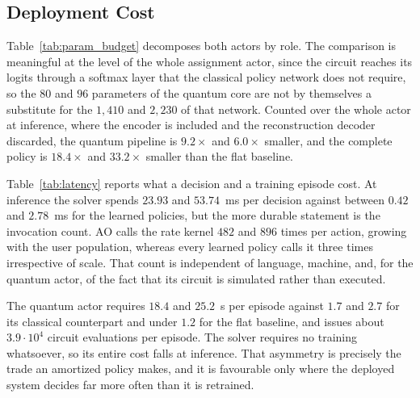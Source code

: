 \documentclass[12pt,onecolumn]{IEEEtran}
\newif\iffull
\begin{document}
\subsection{Deployment Cost}
\label{sec:results_cost}

Table~\ref{tab:param_budget} decomposes both actors by role. The comparison is meaningful at
the level of the whole assignment actor, since the circuit
reaches its logits through a softmax layer that the classical policy network does not
require, so the $80$ and $96$ parameters of the quantum core are not by themselves a
substitute for the $1{,}410$ and $2{,}230$ of that network. Counted over the whole actor at
inference, where the encoder is included and the reconstruction decoder discarded, the
quantum pipeline is $9.2\times$ and $6.0\times$ smaller, and the complete policy is
$18.4\times$ and $33.2\times$ smaller than the flat baseline.

Table~\ref{tab:latency} reports what a decision and a training episode cost. At inference
the solver spends $23.93$ and $53.74$~ms per decision against between $0.42$ and $2.78$~ms
for the learned policies, but the more durable statement is the invocation count. AO calls
the rate kernel $482$ and $896$ times per action, growing with the user population, whereas
every learned policy calls it three times irrespective of scale. That count is independent
of language, machine, and, for the quantum actor, of the fact that its circuit is
simulated rather than executed.

The quantum actor requires $18.4$ and $25.2$~s per
episode against $1.7$ and $2.7$ for its classical counterpart and under $1.2$ for the flat
baseline,  and issues about $3.9{\cdot}10^{4}$ circuit
evaluations per episode. The solver requires no training whatsoever, so its entire cost falls at
inference. That asymmetry is precisely the trade an amortized policy makes, and it is
favourable only where the deployed system decides far more often than it is retrained.

\iffull
Two measurements delimit where the parameter advantage originates. Reducing the register
from eight qubits to six leaves performance inside the spread across training seeds, and
measuring only single-qubit $Z$ observables, eight of them in place of the $26$ of the
structured readout, does the same. The advantage therefore rests on how the state is
compressed for the circuit rather than on the circuit's expressive degrees of
freedom, which Section~\ref{sec:results_quantum} examines in detail.
\fi
\end{document}
